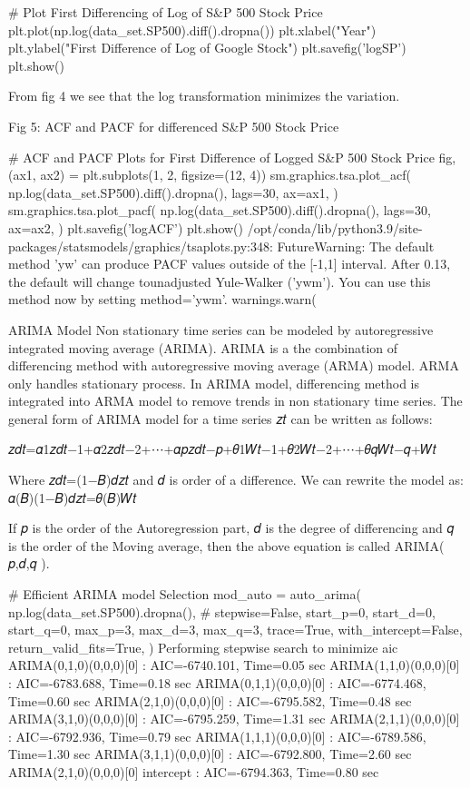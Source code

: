 # Plot First Differencing of Log of S&P 500 Stock Price
plt.plot(np.log(data_set.SP500).diff().dropna())
plt.xlabel("Year")
plt.ylabel("First Difference of Log of Google Stock")
plt.savefig('logSP')
plt.show()

From fig 4 we see that the log transformation minimizes the variation.

Fig 5: ACF and PACF for differenced S&P 500 Stock Price

# ACF and PACF Plots for First Difference of Logged S&P 500 Stock Price
fig, (ax1, ax2) = plt.subplots(1, 2, figsize=(12, 4))
sm.graphics.tsa.plot_acf(
    np.log(data_set.SP500).diff().dropna(),
    lags=30,
    ax=ax1,
)
sm.graphics.tsa.plot_pacf(
    np.log(data_set.SP500).diff().dropna(),
    lags=30,
    ax=ax2,
)
plt.savefig('logACF')
plt.show()
/opt/conda/lib/python3.9/site-packages/statsmodels/graphics/tsaplots.py:348: FutureWarning: The default method 'yw' can produce PACF values outside of the [-1,1] interval. After 0.13, the default will change tounadjusted Yule-Walker ('ywm'). You can use this method now by setting method='ywm'.
  warnings.warn(

ARIMA Model
Non stationary time series can be modeled by autoregressive integrated moving average (ARIMA). ARIMA is a the combination of differencing method with autoregressive moving average (ARMA) model. ARMA only handles stationary process. In ARIMA model, differencing method is integrated into ARMA model to remove trends in non stationary time series. The general form of ARIMA model for a time series  {𝑧𝑡}  can be written as follows:

𝑧𝑑𝑡=𝛼1𝑧𝑑𝑡−1+𝛼2𝑧𝑑𝑡−2+⋯+𝛼𝑝𝑧𝑑𝑡−𝑝+𝜃1𝑊𝑡−1+𝜃2𝑊𝑡−2+⋯+𝜃𝑞𝑊𝑡−𝑞+𝑊𝑡
 
Where  𝑧𝑑𝑡=(1−𝐵)𝑑𝑧𝑡  and  𝑑  is order of a difference.
We can rewrite the model as:
𝛼(𝐵)(1−𝐵)𝑑𝑧𝑡=𝜃(𝐵)𝑊𝑡
 
If  𝑝  is the order of the Autoregression part,  𝑑  is the degree of differencing and  𝑞  is the order of the Moving average, then the above equation is called ARIMA( 𝑝,𝑑,𝑞 ).

# Efficient ARIMA model Selection
mod_auto = auto_arima(
    np.log(data_set.SP500).dropna(),  # stepwise=False,
    start_p=0,
    start_d=0,
    start_q=0,
    max_p=3,
    max_d=3,
    max_q=3,
    trace=True,
    with_intercept=False,
    return_valid_fits=True,
)
Performing stepwise search to minimize aic
 ARIMA(0,1,0)(0,0,0)[0]             : AIC=-6740.101, Time=0.05 sec
 ARIMA(1,1,0)(0,0,0)[0]             : AIC=-6783.688, Time=0.18 sec
 ARIMA(0,1,1)(0,0,0)[0]             : AIC=-6774.468, Time=0.60 sec
 ARIMA(2,1,0)(0,0,0)[0]             : AIC=-6795.582, Time=0.48 sec
 ARIMA(3,1,0)(0,0,0)[0]             : AIC=-6795.259, Time=1.31 sec
 ARIMA(2,1,1)(0,0,0)[0]             : AIC=-6792.936, Time=0.79 sec
 ARIMA(1,1,1)(0,0,0)[0]             : AIC=-6789.586, Time=1.30 sec
 ARIMA(3,1,1)(0,0,0)[0]             : AIC=-6792.800, Time=2.60 sec
 ARIMA(2,1,0)(0,0,0)[0] intercept   : AIC=-6794.363, Time=0.80 sec

